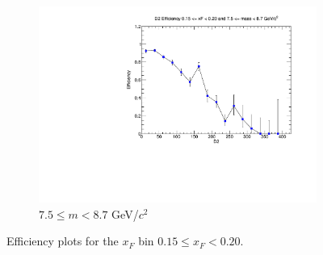 \begin{figure}[p]
\begin{subfigure}[b]{0.32\textwidth}
        \includegraphics[width=\textwidth]{./kTrackerEfficiencyPlots/D2_Efficiency_xF3_mass10.pdf}
        \caption{$7.5 \leq m < 8.7$ GeV/$c^2$}
        \label{fig:xF3_mass10}
    \end{subfigure}
    \hfill
    \caption{Efficiency plots for the $x_F$ bin $0.15 \leq x_F < 0.20$.}
    \label{fig:xF3}
\end{figure}

\clearpage

